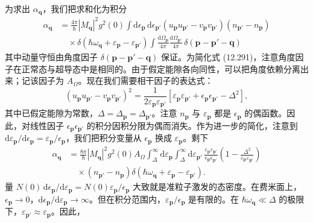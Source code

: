 为求出 $\alpha_{\mathbf{q}}$，我们把求和化为积分
\begin{align*}
\alpha_{\mathbf{q}}&=\frac{4\pi}{\hbar}\left|M_{\mathbf{q}}\right|^{2}g^{2}(0)\int\mathrm{d}\epsilon_{\mathbf{p}}\,\mathrm{d}\epsilon_{\mathbf{p}'}\left(u_{\mathbf{p}}u_{\mathbf{p}'}-v_{\mathbf{p}}v_{\mathbf{p}'}\right)\left(n_{\mathbf{p}'}-n_{\mathbf{p}}\right)\\
&\quad\times\delta\left(\hbar\omega_{\mathbf{q}}+\varepsilon_{\mathbf{p}}-\varepsilon_{\mathbf{p}'}\right)\int\frac{\mathrm{d}\Omega_{\mathbf{p}}}{4\pi}\frac{\mathrm{d}\Omega_{\mathbf{p}'}}{4\pi}\,\delta\left(\mathbf{p}-\mathbf{p}'-\mathbf{q}\right)\tag{12.291}
\end{align*}
其中动量守恒由角度因子 $\delta\left(\mathbf{p}-\mathbf{p}'-\mathbf{q}\right)$ 保证。为简化式 (12.291)，注意角度因子在正常态与超导态中是相同的。由于假定能隙各向同性，可以把角度依赖分离出来；记该因子为 $A_{\Omega}$。现在我们需要相干因子的表达式：
\begin{equation*}
\left(u_{\mathbf{p}}u_{\mathbf{p}'}-v_{\mathbf{p}}v_{\mathbf{p}'}\right)^{2}=\frac{1}{2\varepsilon_{\mathbf{p}}\varepsilon_{\mathbf{p}'}}\left[\varepsilon_{\mathbf{p}}\varepsilon_{\mathbf{p}'}+\epsilon_{\mathbf{p}}\epsilon_{\mathbf{p}'}-\Delta^{2}\right],\tag{12.292}
\end{equation*}
其中已假定能隙为常数，$\Delta=\Delta_{\mathbf{p}}=\Delta_{\mathbf{p}'}$。注意 $n_{\mathbf{p}}$ 与 $\varepsilon_{\mathbf{p}}$ 都是 $\epsilon_{\mathbf{p}}$ 的偶函数。因此，对线性因子 $\epsilon_{\mathbf{p}}\epsilon_{\mathbf{p}'}$ 的积分因积分限为偶而消失。作为进一步的简化，注意到 $\mathrm{d}\varepsilon_{\mathbf{p}}/\mathrm{d}\epsilon_{\mathbf{p}}=\varepsilon_{\mathbf{p}}/\epsilon_{\mathbf{p}}$，我们把积分变量从 $\epsilon_{\mathbf{p}}$ 换成 $\varepsilon_{\mathbf{p}}$。剩下
\begin{align*}
\alpha_{\mathbf{q}}&=\frac{8\pi}{\hbar}\left|M_{\mathbf{q}}\right|^{2}g^{2}(0)A_{\Omega}\int_{\Delta}^{\infty}\mathrm{d}\varepsilon_{\mathbf{p}}\int_{\Delta}^{\infty}\mathrm{d}\varepsilon_{\mathbf{p}'}\,\frac{\varepsilon_{\mathbf{p}}\varepsilon_{\mathbf{p}'}}{\epsilon_{\mathbf{p}}\epsilon_{\mathbf{p}'}}\left(1-\frac{\Delta^{2}}{\varepsilon_{\mathbf{p}}\varepsilon_{\mathbf{p}'}}\right)\\
&\quad\times\left(n_{\mathbf{p}'}-n_{\mathbf{p}}\right)\delta\left(\hbar\omega_{\mathbf{q}}+\varepsilon_{\mathbf{p}}-\varepsilon_{\mathbf{p}'}\right).\tag{12.293}
\end{align*}
量 $N(0)\,\mathrm{d}\epsilon_{\mathbf{p}}/\mathrm{d}\varepsilon_{\mathbf{p}}=N(0)\varepsilon_{\mathbf{p}}/\epsilon_{\mathbf{p}}$ 大致就是准粒子激发的态密度。在费米面上，$\epsilon_{\mathbf{p}}\to 0$，$\mathrm{d}\epsilon_{\mathbf{p}}/\mathrm{d}\varepsilon_{\mathbf{p}}\to\infty$。但在积分范围内，$\varepsilon_{\mathbf{p}}/\epsilon_{\mathbf{p}}$ 是有限的。在 $\hbar\omega_{\mathbf{q}}\ll\Delta$ 的极限下，$\varepsilon_{\mathbf{p}'}\approx\varepsilon_{\mathbf{p}}$。因此，
